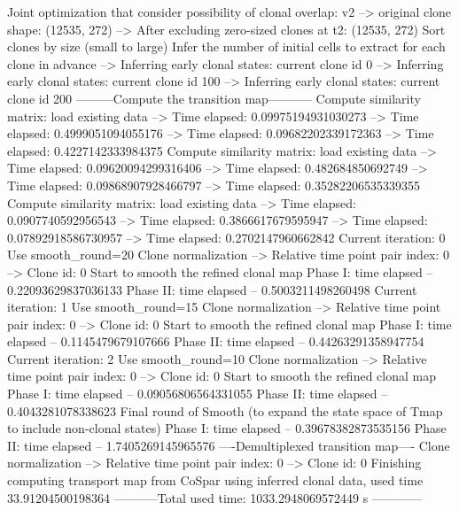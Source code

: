 \documentclass[letterpaper,10pt,english]{sphinxmanual}
\begin{document}
{\begin{sphinxVerbatim}[commandchars=\\\{\}]
Joint optimization that consider possibility of clonal overlap: v2
--> original clone shape: (12535, 272)
--> After excluding zero-sized clones at t2: (12535, 272)
Sort clones by size (small to large)
Infer the number of initial cells to extract for each clone in advance
--> Inferring early clonal states: current clone id 0
--> Inferring early clonal states: current clone id 100
--> Inferring early clonal states: current clone id 200
---------Compute the transition map-----------
Compute similarity matrix: load existing data
--> Time elapsed:  0.09975194931030273
--> Time elapsed:  0.4999051094055176
--> Time elapsed:  0.09682202339172363
--> Time elapsed:  0.4227142333984375
Compute similarity matrix: load existing data
--> Time elapsed:  0.09620094299316406
--> Time elapsed:  0.482684850692749
--> Time elapsed:  0.09868907928466797
--> Time elapsed:  0.35282206535339355
Compute similarity matrix: load existing data
--> Time elapsed:  0.0907740592956543
--> Time elapsed:  0.3866617679595947
--> Time elapsed:  0.07892918586730957
--> Time elapsed:  0.2702147960662842
Current iteration: 0
Use smooth\_round=20
Clone normalization
--> Relative time point pair index: 0
--> Clone id: 0
Start to smooth the refined clonal map
Phase I: time elapsed --  0.22093629837036133
Phase II: time elapsed --  0.5003211498260498
Current iteration: 1
Use smooth\_round=15
Clone normalization
--> Relative time point pair index: 0
--> Clone id: 0
Start to smooth the refined clonal map
Phase I: time elapsed --  0.1145479679107666
Phase II: time elapsed --  0.44263291358947754
Current iteration: 2
Use smooth\_round=10
Clone normalization
--> Relative time point pair index: 0
--> Clone id: 0
Start to smooth the refined clonal map
Phase I: time elapsed --  0.09056806564331055
Phase II: time elapsed --  0.4043281078338623
Final round of Smooth (to expand the state space of Tmap to include non-clonal states)
Phase I: time elapsed --  0.39678382873535156
Phase II: time elapsed --  1.7405269145965576
----Demultiplexed transition map----
Clone normalization
--> Relative time point pair index: 0
--> Clone id: 0
Finishing computing transport map from CoSpar using inferred clonal data, used time 33.91204500198364
-----------Total used time: 1033.2948069572449 s ------------
\end{sphinxVerbatim}
}
\end{document}
